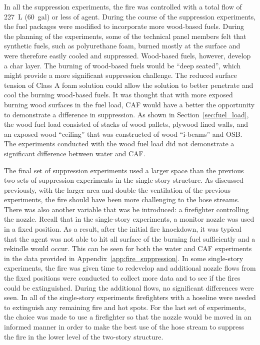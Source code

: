 \documentclass[12pt,oneside]{book}
\begin{document}
In all the suppression experiments, the fire was controlled with a total flow of 227~L (60~gal) or less of agent. During the course of the suppression experiments, the fuel packages were modified to incorporate more wood-based fuels. During the planning of the experiments, some of the technical panel members felt that synthetic fuels, such as polyurethane foam, burned mostly at the surface and were therefore easily cooled and suppressed. Wood-based fuels, however, develop a char layer. The burning of wood-based fuels would be ``deep seated'', which might provide a more significant suppression challenge. The reduced surface tension of Class A foam solution could allow the solution to better penetrate and cool the burning wood-based fuels. It was thought that with more exposed burning wood surfaces in the fuel load, CAF would have a better the opportunity to demonstrate a difference in suppression. As shown in Section~\ref{sec:fuel_load}, the wood fuel load consisted of stacks of wood pallets, plywood lined walls, and an exposed wood ``ceiling'' that was constructed of wood ``i-beams'' and OSB. The experiments conducted with the wood fuel load did not demonstrate a significant difference between water and CAF.  

The final set of suppression experiments used a larger space than the previous two sets of suppression experiments in the single-story structure. As discussed previously, with the larger area and double the ventilation of the previous experiments, the fire should have been more challenging to the hose streams. There was also another variable that was be introduced: a firefighter controlling the nozzle. Recall that in the single-story experiments, a monitor nozzle was used in a fixed position. As a result, after the initial fire knockdown, it was typical that the agent was not able to hit all surface of the burning fuel sufficiently and a rekindle would occur. This can be seen for both the water and CAF experiments in the data provided in Appendix~\ref{app:fire_suppression}. In some single-story experiments, the fire was given time to redevelop and additional nozzle flows from the fixed positions were conducted to collect more data and to see if the fires could be extinguished. During the additional flows, no significant differences were seen. In all of the single-story experiments firefighters with a hoseline were needed to extinguish any remaining fire and hot spots. For the last set of experiments, the choice was made to use a firefighter so that the nozzle would be moved in an informed manner in order to make the best use of the hose stream to suppress the fire in the lower level of the two-story structure.  
\end{document}
